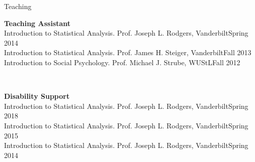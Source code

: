 \begin{rSection}{\textrm{Teaching}}
\medskip\\
\begin{minipage}{\linewidth}{\large {\bf Teaching Assistant}}\\
Introduction to Statistical Analysis. Prof. Joseph L. Rodgers, Vanderbilt\hfill  {Spring 2014}\\
Introduction to Statistical Analysis. Prof. James H. Steiger, Vanderbilt\hfill  {Fall 2013}\\
Introduction to Social Psychology. Prof. Michael J. Strube, WUStL\hfill{Fall 2012}\end{minipage}\medskip\\
\begin{minipage}{\linewidth}{\large {\bf Disability Support}}\\
Introduction to Statistical Analysis. Prof. Joseph L. Rodgers, Vanderbilt\hfill  {Spring 2018}\\
Introduction to Statistical Analysis. Prof. Joseph L. Rodgers, Vanderbilt\hfill  {Spring 2015}\\
Introduction to Statistical Analysis. Prof. Joseph L. Rodgers, Vanderbilt\hfill{Spring 2014}\end{minipage}%
\end{rSection}
